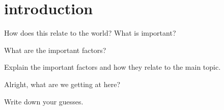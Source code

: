 \section{introduction}

How does this relate to the world? What is important?

What are the important factors?

Explain the important factors and how they relate to the main topic.

Alright, what are we getting at here?

Write down your guesses.
